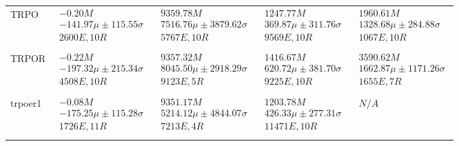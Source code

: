 \begin{tabular}{|l|p{3.2cm}|p{3.2cm}|p{3.2cm}|p{3.2cm}|}
TRPO & $\begin{array}{c} -0.20M \\ -141.97\mu \pm 115.55\sigma \\ 2600E, 10R \end{array}$ & $\begin{array}{c} 9359.78M \\ 7516.76\mu \pm 3879.62\sigma \\ 5767E, 10R \end{array}$ & $\begin{array}{c} 1247.77M \\ 369.87\mu \pm 311.76\sigma \\ 9569E, 10R \end{array}$ & $\begin{array}{c} 1960.61M \\ 1328.68\mu \pm 284.88\sigma \\ 1067E, 10R \end{array}$ \\ \\ \hline
TRPOR & $\begin{array}{c} -0.22M \\ -197.32\mu \pm 215.34\sigma \\ 4508E, 10R \end{array}$ & $\begin{array}{c} 9357.32M \\ 8045.50\mu \pm 2918.29\sigma \\ 9123E, 5R \end{array}$ & $\begin{array}{c} 1416.67M \\ 620.72\mu \pm 381.70\sigma \\ 9225E, 10R \end{array}$ & $\begin{array}{c} 3590.62M \\ 1662.87\mu \pm 1171.26\sigma \\ 1655E, 7R \end{array}$ \\ \\ \hline
trpoer1 & $\begin{array}{c} -0.08M \\ -175.25\mu \pm 115.28\sigma \\ 1726E, 11R \end{array}$ & $\begin{array}{c} 9351.17M \\ 5214.12\mu \pm 4844.07\sigma \\ 7213E, 4R \end{array}$ & $\begin{array}{c} 1203.78M \\ 426.33\mu \pm 277.31\sigma \\ 11471E, 10R \end{array}$ & $\begin{array}{c} N/A \end{array}$ \\ \\ \hline

\end{tabular}
